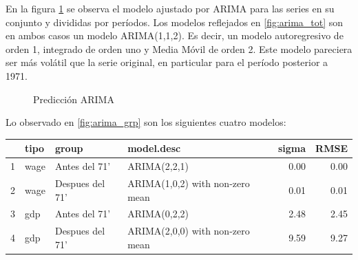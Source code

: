 \documentclass[a4paper]{article}
\begin{document}
En la figura \ref{fig:arima} se observa el modelo ajustado por ARIMA para las series en su conjunto y divididas por períodos. 
Los modelos reflejados en \ref{fig:arima_tot} son en ambos casos un modelo ARIMA(1,1,2). Es decir, un modelo autoregresivo de orden 1, integrado de orden uno y Media Móvil de orden 2. Este modelo pareciera ser más volátil que la serie original, en particular para el período posterior a 1971.

\begin{figure}[H]
	\centering
	\caption{Predicción ARIMA} \label{fig:arima}
\end{figure}

Lo observado en \ref{fig:arima_grp} son los siguientes cuatro modelos: 

\begin{table}[ht]
	\centering
	\begin{tabular}{rlllrr}
		\hline
		& tipo & group & model.desc & sigma & RMSE \\ 
		\hline
		1 & wage & Antes del 71' & ARIMA(2,2,1) & 0.00 & 0.00 \\ 
		2 & wage & Despues del 71' & ARIMA(1,0,2) with non-zero mean & 0.01 & 0.01 \\ 
		3 & gdp & Antes del 71' & ARIMA(0,2,2) & 2.48 & 2.45 \\ 
		4 & gdp & Despues del 71' & ARIMA(2,0,0) with non-zero mean & 9.59 & 9.27 \\ 
		\hline
	\end{tabular}
\end{table}
\end{document}
